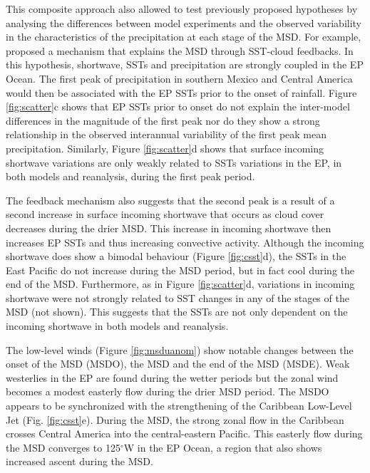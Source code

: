  This composite approach also allowed to test previously proposed hypotheses by analysing the differences between model experiments and the observed variability in the characteristics of the precipitation at each stage of the MSD.
 For example, \cite{magana1999} proposed a mechanism that explains the MSD through SST-cloud feedbacks. In this hypothesis, shortwave, SSTs and precipitation are strongly coupled in the EP Ocean. The first peak of precipitation in southern Mexico and Central America would then be associated with the EP SSTs prior to the onset of rainfall. 
 Figure \ref{fig:scatter}c shows that EP SSTs prior to onset do not explain the inter-model differences in the magnitude of the first peak nor do they show a strong relationship in the observed interannual variability of the first peak mean precipitation. 
 Similarly, Figure \ref{fig:scatter}d shows that surface incoming shortwave variations are only weakly related to SSTs variations in the EP, in both models and reanalysis, during the first peak period. 
 
The feedback mechanism also suggests that the second peak is a result of a second increase in surface incoming shortwave that occurs as cloud cover decreases during the drier MSD. This increase in incoming shortwave then increases EP SSTs and thus increasing convective activity. Although the incoming shortwave does show a bimodal behaviour (Figure \ref{fig:csst}d), the SSTs in the East Pacific do not increase during the MSD period, but in fact cool during the end of the MSD.   Furthermore, as in Figure \ref{fig:scatter}d, variations in incoming shortwave were not strongly related to SST changes in any of the stages of the MSD (not shown). This suggests that the SSTs are not only dependent on the incoming shortwave in both models and reanalysis.

The low-level winds (Figure \ref{fig:msduanom}) show notable changes between the onset of the MSD (MSDO), the MSD and the end of the MSD (MSDE).
  Weak westerlies in the EP are found during the wetter periods but the zonal wind becomes a modest easterly flow during the drier MSD period. 
  The MSDO appears to be synchronized with the strengthening of the Caribbean Low-Level Jet (Fig. \ref{fig:csst}e). During the MSD, the strong zonal flow in the Caribbean crosses Central America into the central-eastern Pacific. This easterly flow during the MSD converges to 125$^\circ$W in the EP Ocean, a region that also shows increased ascent during the MSD. 
 
